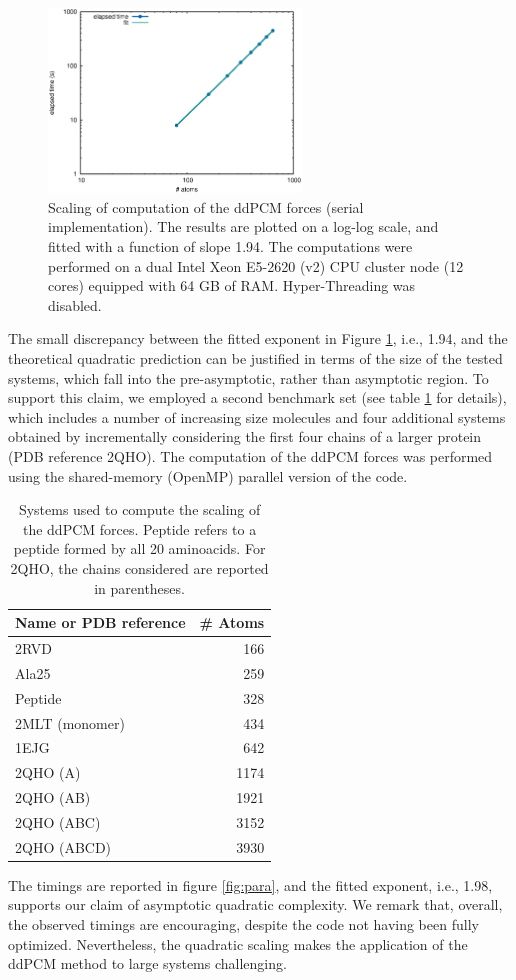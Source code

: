 \documentclass[aip,jcp,a4paper,11pt]{revtex4-1}
\begin{document}
\begin{figure}[t]
 \caption{Scaling of computation of the ddPCM forces (serial implementation). The results are plotted on a log-log scale, and fitted with a function of slope 1.94. The computations were performed on a dual Intel Xeon E5-2620 (v2) CPU cluster node (12 cores) equipped with 64 GB of RAM. Hyper-Threading was disabled.
 \label{fig:serial}}
 \includegraphics[width=0.6\textwidth]{serial.eps}
\end{figure}

The small discrepancy between the fitted exponent in Figure \ref{fig:serial}, i.e., 1.94, and the theoretical quadratic prediction can be justified in terms of the size of the tested systems, which fall into the pre-asymptotic, rather than asymptotic region. \color{red}To support this claim, we employed a second benchmark set (see table \ref{tab:set} for details), which includes a number of increasing size molecules and four additional systems obtained by incrementally considering the first four chains of a larger protein (PDB reference 2QHO). The computation of the ddPCM forces was performed using the shared-memory (OpenMP) parallel version of the code. 
\begin{table}
 \caption{Systems used to compute the scaling of the ddPCM forces. Peptide refers to a peptide formed by all 20 aminoacids. For 2QHO, the chains considered are reported in parentheses.\label{tab:set}}
 \begin{tabular}{lr}
  \toprule[0.1em] 
  Name or PDB reference & \# Atoms \\
  \midrule[0.05em]
  2RVD & 166 \\
  Ala25 & 259 \\
  Peptide & 328 \\
  2MLT (monomer) & 434 \\
  1EJG & 642 \\
  2QHO (A) & 1174 \\
  2QHO (AB) & 1921 \\
  2QHO (ABC) & 3152 \\
  2QHO (ABCD) & 3930 \\
  \bottomrule[0.1em]
 \end{tabular}
\end{table}
\color{black}
The timings are reported in figure \ref{fig:para}, and the fitted exponent, i.e., 1.98, supports our claim of asymptotic quadratic complexity. We remark that, overall, the observed timings are encouraging, despite the code not having been fully optimized. Nevertheless, the quadratic scaling makes the application of the ddPCM method to large systems challenging. 
\end{document}

